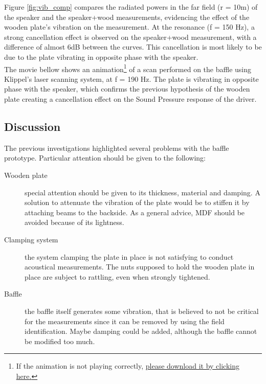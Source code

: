 \documentclass{report}
\newif\ifdraft
\begin{document}
Figure \ref{fig:vib_comp} compares the radiated powers in the far field (r = 10m) of the speaker and the speaker+wood measurements, evidencing the effect of the wooden plate's vibration on the measurement. At the resonance (f = 150 Hz), a strong cancellation effect is observed on the speaker+wood measurement, with a difference of almost 6dB between the curves. This cancellation is most likely to be due to the plate vibrating in opposite phase with the speaker. \\
The movie bellow shows an animation\footnote{If the animation is not playing correctly, \href{https://www.dropbox.com/sh/1jlodpb3biuxmhy/AADFRz8B249n8ERu3nkwyyisa?dl=0}{please download it by clicking \underline{here}.}} of a scan performed on the baffle using Klippel's laser scanning system, at f = 190 Hz. The plate is vibrating in opposite phase with the speaker,  which confirms the previous hypothesis of the wooden plate creating a cancellation effect on the Sound Pressure response of the driver. 

\ifdraft
\begin{center}
	\includemovie[draft,repeat,poster,label=baffle_vib,text={\small(Click to start...)}]{6cm}{4cm}{GridOpti/baffle_vib.avi}
\end{center}
\else
\begin{center}
\end{center}
\fi


\subsection{Discussion}

The previous investigations highlighted several problems with the baffle prototype. Particular attention should be given to the following:
\begin{description}
\item[Wooden plate] special attention should be given to its thickness, material and damping. A solution to attenuate the vibration of the plate would be to stiffen it by attaching beams to the backside. As a general advice, MDF should be avoided because of its lightness. 
\item[Clamping system] the system clamping the plate in place is not satisfying to conduct acoustical measurements. The nuts supposed to hold the wooden plate in place are subject to rattling, even when strongly tightened.
\item[Baffle] the baffle itself generates some vibration, that is believed to not be critical for the measurements since it can be removed by using the field identification. Maybe damping could be added, although the baffle cannot be modified too much. 
\end{description}
\end{document}

